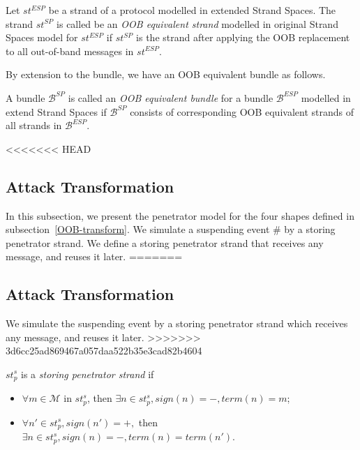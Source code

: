 \begin{Definition}
\begin{Definition} Let $st^{ESP}$ be a strand of a protocol modelled in extended Strand Spaces. The strand $st^{SP}$ is called be an \emph{OOB equivalent strand} modelled in original Strand Spaces model for $st^{ESP}$ if $st^{SP}$ is the strand after applying the OOB replacement to all out-of-band messages in $st^{ESP}$.
\end{Definition}

By extension to the bundle, we have an OOB equivalent bundle as follows. 

\begin{Definition}\label{iopmf} A bundle $\mathcal{B}^{SP}$ is called an \emph{OOB equivalent bundle} for a bundle $\mathcal{B}^{ESP}$ modelled in extend Strand Spaces if $\mathcal{B}^{SP}$ consists of corresponding OOB equivalent strands of all strands in $\mathcal{B}^{ESP}$. 
\end{Definition}

<<<<<<< HEAD

\subsection{Attack Transformation}\label{attacktransform}

In this subsection, we present the penetrator model for the four shapes defined in subsection~\ref{OOB-transform}. We simulate a suspending event $\#$ by a storing penetrator strand. We define a storing penetrator strand that receives any message, and reuses it later. 
=======
\subsection{Attack Transformation}\label{attacktransform}

We simulate the suspending event by a storing penetrator strand which receives any message, and reuses it later. 
>>>>>>> 3d6cc25ad869467a057daa522b35e3cad82b4604

\begin{Definition}
$st^s_p$ is a \emph{storing penetrator strand} if 
\begin{itemize}
\item $\forall m \in \mathcal{M}$ in $st^s_p$, then $\exists n \in st^s_p, sign(n) = -, term(n) = m$;
\item $\forall n' \in st^s_p, sign(n') = +,$ then $\exists n \in st^s_p, sign(n)= -, term(n)= term(n')$.
\end{itemize}
\end{Definition}


\end{Definition}
